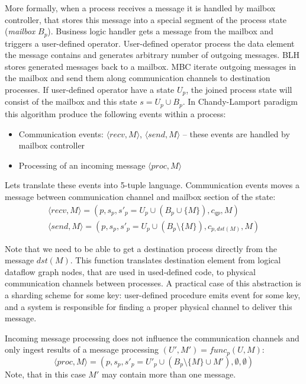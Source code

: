 More formally, when a process receives a message it is handled by mailbox controller, that stores this message into a special segment of the process state ({\em mailbox} $B_p$). Business logic handler gets a message from the mailbox and triggers a user-defined operator. User-defined operator process the data element the message contains and generates arbitrary number of outgoing messages. BLH stores generated messages back to a mailbox. MBC iterate outgoing messages in the mailbox and send them along communication channels to destination processes. If user-defined operator have a state $U_p$, the joined process state will consist of the mailbox and this state $s=U_p \cup B_p$. In Chandy-Lamport paradigm this algorithm produce the following events within a process:
\begin{itemize}
    \item Communication events: $\langle recv, M\rangle$, $\langle send, M \rangle$ -- these events are handled by mailbox controller
    \item Processing of an incoming message $\langle proc, M\rangle$
\end{itemize}

Lets translate these events into 5-tuple language. Communication events moves a message between communication channel and mailbox section of the state:
\begin{eqnarray}
\langle recv, M\rangle = (p, s_p, s'_p = U_p \cup \left(B_p \cup \{M\}\right), c_{qp}, M) \\
\langle send, M \rangle = (p, s_p, s'_p = U_p \cup \left(B_p\setminus\{M\}\right), c_{p, dst(M)}, M)
\end{eqnarray}

Note that we need to be able to get a destination process directly from the message $dst(M)$. This function translates destination element from logical dataflow graph nodes, that are used in used-defined code, to physical communication channels between processes. A practical case of this abstraction is a sharding scheme for some key: user-defined procedure emits event for some key, and a system is responsible for finding a proper physical channel to deliver this message.

Incoming message processing does not influence the communication channels and only ingest results of a message processing $(U', M') = func_p(U, M)$:
\begin{equation}
    \langle proc, M\rangle = (p, s_p, s'_p = U'_p \cup \left(B_p \setminus \{M\} \cup M' \right) , \emptyset, \emptyset)
\end{equation}
Note, that in this case $M'$ may contain more than one message.

